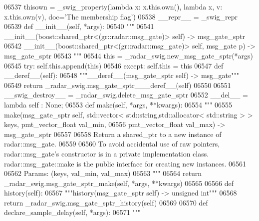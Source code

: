 \begin{DoxyCode}
{{{{{{{{{{{{{{{{{{{{{{06537     thisown = _swig_property(\textcolor{keyword}{lambda} x: x.this.own(), \textcolor{keyword}{lambda} x, v: x.this.own(v), doc=\textcolor{stringliteral}{'The membership flag'})
06538     \_\_repr\_\_ = \_swig\_repr
06539     \textcolor{keyword}{def }__init__(self, *args): 
06540         \textcolor{stringliteral}{"""}
06541 \textcolor{stringliteral}{        \_\_init\_\_(boost::shared\_ptr<(gr::radar::msg\_gate)> self) -> msg\_gate\_sptr}
06542 \textcolor{stringliteral}{        \_\_init\_\_(boost::shared\_ptr<(gr::radar::msg\_gate)> self, msg\_gate p) -> msg\_gate\_sptr}
06543 \textcolor{stringliteral}{        """}
06544         this = \_radar\_swig.new\_msg\_gate\_sptr(*args)
06545         \textcolor{keywordflow}{try}: self.this.append(this)
06546         \textcolor{keywordflow}{except}: self.this = this
06547     \textcolor{keyword}{def }__deref__(self):
06548         \textcolor{stringliteral}{"""\_\_deref\_\_(msg\_gate\_sptr self) -> msg\_gate"""}
06549         \textcolor{keywordflow}{return} \_radar\_swig.msg\_gate\_sptr\_\_\_deref\_\_(self)
06550 
06551     \_\_swig\_destroy\_\_ = \_radar\_swig.delete\_msg\_gate\_sptr
06552     \_\_del\_\_ = \textcolor{keyword}{lambda} self : \textcolor{keywordtype}{None};
06553     \textcolor{keyword}{def }make(self, *args, **kwargs):
06554         \textcolor{stringliteral}{"""}
06555 \textcolor{stringliteral}{        make(msg\_gate\_sptr self, std::vector< std::string,std::allocator< std::string > > keys,
       pmt\_vector\_float val\_min, }
06556 \textcolor{stringliteral}{            pmt\_vector\_float val\_max) -> msg\_gate\_sptr}
06557 \textcolor{stringliteral}{}
06558 \textcolor{stringliteral}{        Return a shared\_ptr to a new instance of radar::msg\_gate.}
06559 \textcolor{stringliteral}{}
06560 \textcolor{stringliteral}{        To avoid accidental use of raw pointers, radar::msg\_gate's constructor is in a private
       implementation class. radar::msg\_gate::make is the public interface for creating new instances.}
06561 \textcolor{stringliteral}{}
06562 \textcolor{stringliteral}{        Params: (keys, val\_min, val\_max)}
06563 \textcolor{stringliteral}{        """}
06564         \textcolor{keywordflow}{return} \_radar\_swig.msg\_gate\_sptr\_make(self, *args, **kwargs)
06565 
06566     \textcolor{keyword}{def }history(self):
06567         \textcolor{stringliteral}{"""history(msg\_gate\_sptr self) -> unsigned int"""}
06568         \textcolor{keywordflow}{return} \_radar\_swig.msg\_gate\_sptr\_history(self)
06569 
06570     \textcolor{keyword}{def }declare_sample_delay(self, *args):
06571         \textcolor{stringliteral}{"""}
}}}}}}}}}}}}}}}}}}}}}}
\end{DoxyCode}
